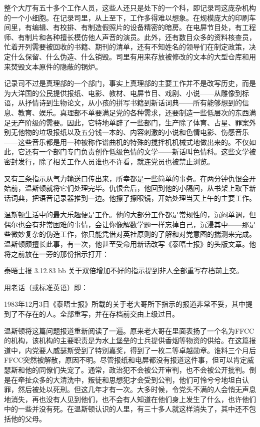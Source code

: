 整个大厅有五十多个工作人员，这些人还只是处下的一个科，即记录司这庞杂机构的一个小细胞。在记录司里，从上至下，工作多得难以想象。在规模庞大的印刷车间里，有编辑、有校排、有制造假照片的设备精密的暗房。在电屏节目处，有工程师、有制片和各种擅长模仿他人声音的演员。此外，还有数目众多的资料核查员，忙着开列需要被回收的书籍、期刊的清单，还有不知姓名的领导们在制定政策，决定什么保留、什么伪造、什么销毁。司里有用来存放被修改的文本的大型仓库和用来焚毁文本原件的隐蔽的锅炉。

记录司不过是真理部的一个部门，事实上真理部的主要工作并不是改写历史，而是为大洋国的公民提供报纸、电影、教材、电屏节目、戏剧、小说------从雕像到标语，从抒情诗到生物论文，从小孩的拼写书籍到新话词典------所有能够想到的信息、教育、娱乐。真理部不单要满足党的各种需求，还要制造一些低层次的东西满足无产阶级的需要。因此，它特地单辟了一些部门，生产除了体育、占星、罪案外别无他物的垃圾报纸以及五分钱一本的、内容刺激的小说和色情电影、伤感音乐------这些音乐都是用一种被称作谱曲机的特殊的搅拌机机械式地做出来的。不仅如此，它还有一个部门专门负责创作低级色情的文学------新话叫色情科。这些文学被密封发行，除了相关工作人员谁也不许看，就连党员也被禁止浏览。

又有三条指示从气力输送口传出来，所幸都是一些简单的事务。在两分钟仇恨会开始前，温斯顿就将它们处理完毕。仇恨会后，他回到他的小隔间，从书架上取下新话词典，把语音记录器推到一边。他擦了擦眼镜，开始处理当天上午的主要工作。

温斯顿生活中的最大乐趣便是工作。他的大部分工作都是常规性的，沉闷单调，但偶尔也会有非常困难的事情，会让你像解数学题一样忘掉自己，沉浸其中------那是些微妙复杂的伪造工作，你只能凭借对英社原则的了解和对党意图的揣测来完成。温斯顿颇擅长此事，有一次，他甚至受命用新话改写《泰晤士报》的头版文章。他将之前放在一旁的那份指示打开：

泰晤士报 3.12.83 bb 关于双倍增加不好的指示提到非人全部重写存档前上交。

用老话（或标准英语）即：

1983年12月3日《泰晤士报》所载的关于老大哥所下指示的报道非常不妥，其中提到了不存在的人。全部重写，并在存档前交由上级过目。

温斯顿将这篇问题报道重新阅读了一遍。原来老大哥在里面表扬了一个名为FFCC的机构，该机构的主要职责是为水上堡垒的士兵提供香烟等物资的供给。在这篇报道中，内党要人威瑟斯受到了特别嘉奖，得到了一枚二等卓越勋章。谁料三个月后FFCC突然被解散，原因不明。尽管报纸和电屏都没有报道这件事，但可以肯定威瑟斯和他的同僚们失宠了。通常，政治犯不会被公开审判，也不会被公开批判。倒是在牵扯众多的大清洗中，叛徒和思想犯才会受到公判，他们可怜兮兮地坦白认罪，然后被处以死刑。但这几年才有一次。大多时候，令党头不满的人会悄无声息地消失，再也没有人见到他们，也不会有人知道在他们身上发生了什么，也许他们中的一些并没有死。在温斯顿认识的人里，有三十多人就这样消失了，其中还不包括他的父母。

